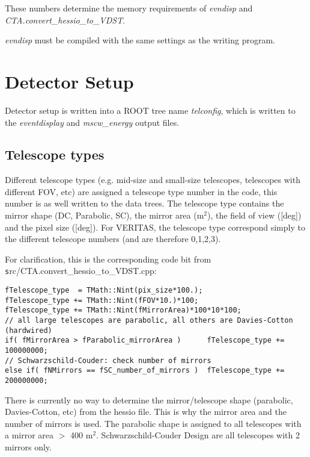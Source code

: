 \documentclass[titlepage,a4paper,twoside,11pt]{report}
\begin{document}
 These numbers determine the memory requirements of {\it evndisp} and 
{\it CTA.convert\_hessio\_to\_VDST}.

 {\it evndisp} must be compiled with the same settings as the writing program.


\chapter{Detector Setup}

Detector setup is written into a ROOT tree name {\it telconfig}, which is written to the {\it eventdisplay} and {\it mscw\_energy} output files.

\section{Telescope types}

Different telescope types (e.g. mid-size and small-size telescopes, telescopes with different FOV, etc) are assigned a telescope type number in the code, this number is as well written to the data trees. The telescope type  contains the mirror shape (DC, Parabolic, SC), the mirror area (m$^2$), the field of view ([deg]) and the pixel size ([deg]). For VERITAS, the telescope type correspond simply to the different telescope numbers (and are therefore 0,1,2,3).

For clarification, this is the corresponding code bit from {\texttt src/CTA.convert\_hessio\_to\_VDST.cpp}:

\begin{lstlisting}
fTelescope_type  = TMath::Nint(pix_size*100.);
fTelescope_type += TMath::Nint(fFOV*10.)*100;
fTelescope_type += TMath::Nint(fMirrorArea)*100*10*100;
// all large telescopes are parabolic, all others are Davies-Cotton (hardwired)
if( fMirrorArea > fParabolic_mirrorArea )      fTelescope_type += 100000000;
// Schwarzschild-Couder: check number of mirrors
else if( fNMirrors == fSC_number_of_mirrors )  fTelescope_type += 200000000;
\end{lstlisting}

 There is currently no way to determine the mirror/telescope shape (parabolic, Davies-Cotton, etc) from the hessio file. This is why the mirror area and the number of mirrors is used. 
The parabolic shape is assigned to all telescopes with a mirror area  $>$ 400 m$^2$.
Schwarzschild-Couder Design are all telescopes with 2 mirrors only.
\end{document}
